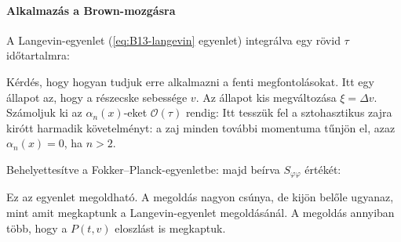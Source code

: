   \paragraph{Alkalmazás a Brown-mozgásra}
   
   A Langevin-egyenlet (\eqref{eq:B13-langevin} egyenlet) integrálva egy rövid $\tau$ időtartalmra:
   
   Kérdés, hogy hogyan tudjuk erre alkalmazni a fenti megfontolásokat.
   Itt egy állapot az, hogy a részecske sebessége $v$.
   Az állapot kis megváltozása $\xi=\Delta v$.
   Számoljuk ki az $\alpha_n(x)$-eket $\mathcal{O}(\tau)$ rendig:
   Itt tesszük fel a sztohasztikus zajra kirótt harmadik követelményt: a zaj minden további momentuma tűnjön el, azaz $\alpha_n(x)=0$, ha $n>2$. 
   
   Behelyettesítve a Fokker--Planck-egyenletbe:
   majd beírva $S_{\varphi\varphi}$ értékét:
   
   Ez az egyenlet megoldható.
   A megoldás nagyon csúnya, de kijön belőle ugyanaz, mint amit megkaptunk a Langevin-egyenlet megoldásánál.
   A megoldás annyiban több, hogy a $P(t,v)$ eloszlást is megkaptuk.
